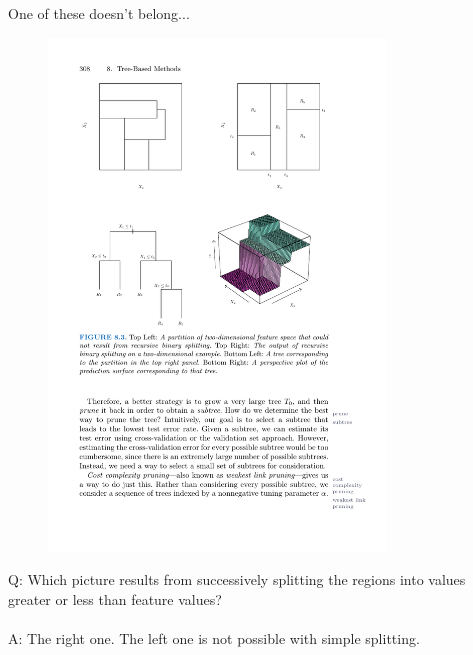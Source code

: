 \documentclass[mathserif, aspectratio=169]{beamer}
\begin{document}
\begin{frame}{One of these doesn't belong...}

\begin{figure}
\includegraphics[width=0.8\textwidth]{partition_examples}
\caption*{}
\end{figure}

\vspace*{-10mm}

Q:  Which picture results from successively splitting the regions into values greater or less than feature values?\\~\\
\pause
A: The right one.  The left one is not possible with simple splitting.  
\end{frame}
\end{document}
